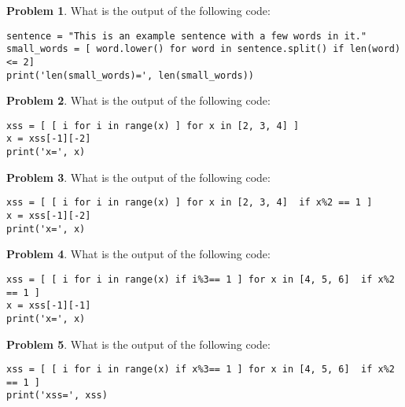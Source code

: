 \documentclass[10pt]{article}
\theoremstyle{definition}
\newtheorem{problem}{Problem}
\begin{document}
\begin{problem}
    What is the output of the following code:
\end{problem}
\begin{lstlisting}
sentence = "This is an example sentence with a few words in it."
small_words = [ word.lower() for word in sentence.split() if len(word) <= 2]
print('len(small_words)=', len(small_words))
\end{lstlisting}
\vspace{1.2in}


\newpage
\begin{problem}
    What is the output of the following code:
\end{problem}
\begin{lstlisting}
xss = [ [ i for i in range(x) ] for x in [2, 3, 4] ]
x = xss[-1][-2]
print('x=', x)
\end{lstlisting}
\vspace{3in}

\begin{problem}
    What is the output of the following code:
\end{problem}
\begin{lstlisting}
xss = [ [ i for i in range(x) ] for x in [2, 3, 4]  if x%2 == 1 ]
x = xss[-1][-2]
print('x=', x)
\end{lstlisting}
\vspace{2.0in}


\newpage
\begin{problem}
    What is the output of the following code:
\end{problem}
\begin{lstlisting}
xss = [ [ i for i in range(x) if i%3== 1 ] for x in [4, 5, 6]  if x%2 == 1 ]
x = xss[-1][-1]
print('x=', x)
\end{lstlisting}
\vspace{3.0in}


\begin{problem}
    What is the output of the following code:
\end{problem}
\begin{lstlisting}
xss = [ [ i for i in range(x) if x%3== 1 ] for x in [4, 5, 6]  if x%2 == 1 ]
print('xss=', xss)
\end{lstlisting}
\vspace{2.0in}
\end{document}
